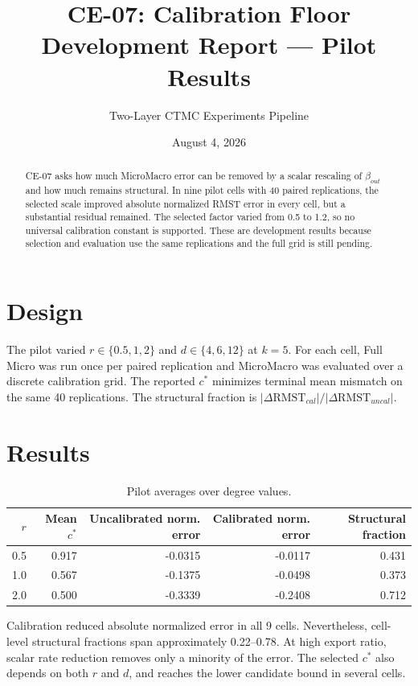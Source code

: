\documentclass[11pt,a4paper]{article}
\title{CE-07: Calibration Floor\\Development Report --- Pilot Results}
\author{Two-Layer CTMC Experiments Pipeline}
\date{August 4, 2026}
\begin{document}
\maketitle
\begin{abstract}
CE-07 asks how much MicroMacro error can be removed by a scalar rescaling of $\beta_{out}$ and how much remains structural. In nine pilot cells with 40 paired replications, the selected scale improved absolute normalized RMST error in every cell, but a substantial residual remained. The selected factor varied from 0.5 to 1.2, so no universal calibration constant is supported. These are development results because selection and evaluation use the same replications and the full grid is still pending.
\end{abstract}
\section{Design}
The pilot varied $r\in\{0.5,1,2\}$ and $d\in\{4,6,12\}$ at $k=5$. For each cell, Full Micro was run once per paired replication and MicroMacro was evaluated over a discrete calibration grid. The reported $c^*$ minimizes terminal mean mismatch on the same 40 replications. The structural fraction is $|\Delta\mathrm{RMST}_{cal}|/|\Delta\mathrm{RMST}_{uncal}|$.

\section{Results}
\begin{table}[H]\centering
\caption{Pilot averages over degree values.}
\begin{tabular}{rrrrr}\toprule
$r$ & Mean $c^*$ & Uncalibrated norm. error & Calibrated norm. error & Structural fraction\\\midrule
0.5 & 0.917 & -0.0315 & -0.0117 & 0.431\\
1.0 & 0.567 & -0.1375 & -0.0498 & 0.373\\
2.0 & 0.500 & -0.3339 & -0.2408 & 0.712\\
\bottomrule\end{tabular}
\end{table}
Calibration reduced absolute normalized error in all 9 cells. Nevertheless, cell-level structural fractions span approximately 0.22--0.78. At high export ratio, scalar rate reduction removes only a minority of the error. The selected $c^*$ also depends on both $r$ and $d$, and reaches the lower candidate bound in several cells.
\end{document}
